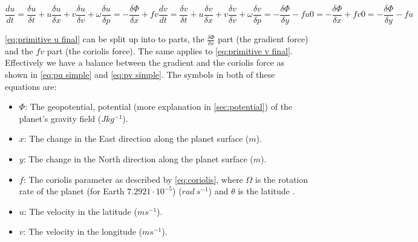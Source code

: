 \begin{subequations}
    \begin{equation}
        \frac{du}{dt} = \frac{\delta u}{\delta t} + u\frac{\delta u}{ \delta x} + v\frac{\delta u}{\delta v} + \omega\frac{\delta u}{\delta p} = -\frac{\delta \Phi}{\delta x} + fv
        \label{eq:primitive u}
    \end{equation}
    \begin{equation}
        \frac{dv}{dt} = \frac{\delta v}{\delta t} + u\frac{\delta v}{ \delta x} + v\frac{\delta v}{\delta v} + \omega\frac{\delta v}{\delta p} = -\frac{\delta \Phi}{\delta y} - fu
        \label{eq:primitive v}
    \end{equation}

    \begin{equation}
        0 = -\frac{\delta \Phi}{\delta x} + fv
        \label{eq:primitive u final}
    \end{equation}
    \begin{equation}
        0 = -\frac{\delta \Phi}{\delta y} - fu
        \label{eq:primitive v final}
    \end{equation}
\end{subequations}

\autoref{eq:primitive u final} can be split up into to parts, the $\frac{\delta \Phi}{\delta x}$ part (the gradient force) and the $fv$ part (the coriolis force). The same applies to 
\autoref{eq:primitive v final}. Effectively we have a balance between the gradient and the coriolis force as shown in \autoref{eq:pu simple} and \autoref{eq:pv simple}. The symbols in both of 
these equations are:

\begin{itemize}
    \item $\Phi$: The geopotential, potential (more explanation in \autoref{sec:potential}) of the planet's gravity field ($Jkg^{-1}$).
    \item $x$: The change in the East direction along the planet surface ($m$).
    \item $y$: The change in the North direction along the planet surface ($m$).
    \item $f$: The coriolis parameter as described by \autoref{eq:coriolis}, where $\Omega$ is the rotation rate of the planet (for Earth $7.2921 \cdot 10^{-5}$) ($rad \ s^{-1}$) and $\theta$ is the 
    latitude \cite{coriolis}.
    \item $u$: The velocity in the latitude ($ms^{-1}$).
    \item $v$: The velocity in the longitude ($ms^{-1}$).
\end{itemize}

